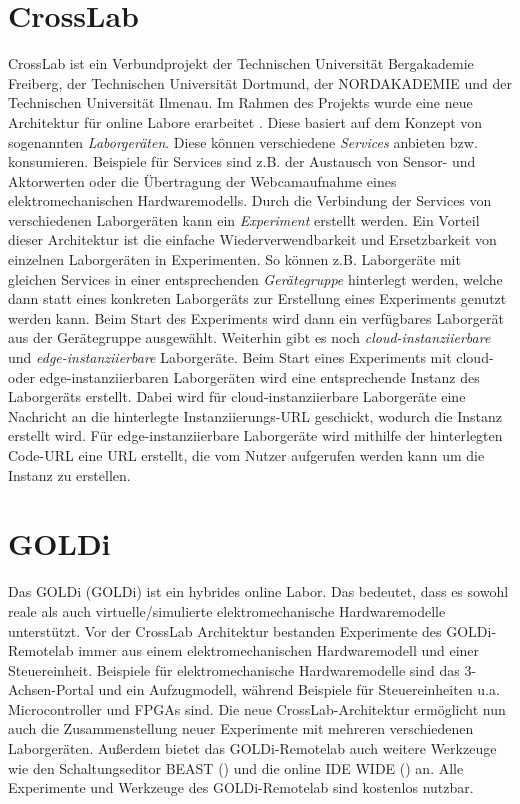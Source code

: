 \section{CrossLab}\label{section:grundlagen:crosslab}
CrossLab \cite{aubel_adaptable_2022} ist ein Verbundprojekt der Technischen Universität Bergakademie Freiberg, der Technischen Universität Dortmund, der NORDAKADEMIE und der Technischen Universität Ilmenau. Im Rahmen des Projekts wurde eine neue Architektur für online Labore erarbeitet \cite{nau_new_2022}. Diese basiert auf dem Konzept von sogenannten \textit{Laborgeräten}. Diese können verschiedene \textit{Services} anbieten bzw. konsumieren. Beispiele für Services sind z.B. der Austausch von Sensor- und Aktorwerten oder die Übertragung der Webcamaufnahme eines elektromechanischen Hardwaremodells. Durch die Verbindung der Services von verschiedenen Laborgeräten kann ein \textit{Experiment} erstellt werden. Ein Vorteil dieser Architektur ist die einfache Wiederverwendbarkeit und Ersetzbarkeit von einzelnen Laborgeräten in Experimenten. So können z.B. Laborgeräte mit gleichen Services in einer entsprechenden \textit{Gerätegruppe} hinterlegt werden, welche dann statt eines konkreten Laborgeräts zur Erstellung eines Experiments genutzt werden kann. Beim Start des Experiments wird dann ein verfügbares Laborgerät aus der Gerätegruppe ausgewählt. Weiterhin gibt es noch \textit{cloud-instanziierbare} und \textit{edge-instanziierbare} Laborgeräte. Beim Start eines Experiments mit cloud- oder edge-instanziierbaren Laborgeräten wird eine entsprechende Instanz des Laborgeräts erstellt. Dabei wird für cloud-instanziierbare Laborgeräte eine Nachricht an die hinterlegte Instanziierungs-URL geschickt, wodurch die Instanz erstellt wird. Für edge-instanziierbare Laborgeräte wird mithilfe der hinterlegten Code-URL eine URL erstellt, die vom Nutzer aufgerufen werden kann um die Instanz zu erstellen.

\section{GOLDi}\label{section:grundlagen:goldi}
Das \acl{GOLDi} (\acs{GOLDi}) \cite{sitepoint_goldi_nodate} ist ein hybrides online Labor. Das bedeutet, dass es sowohl reale als auch virtuelle/simulierte elektromechanische Hardwaremodelle unterstützt. Vor der CrossLab Architektur bestanden Experimente des GOLDi-Remotelab immer aus einem elektromechanischen Hardwaremodell und einer Steuereinheit. Beispiele für elektromechanische Hardwaremodelle sind das 3-Achsen-Portal und ein Aufzugmodell, während Beispiele für Steuereinheiten u.a. Microcontroller und \acp{FPGA} sind. Die neue CrossLab-Architektur ermöglicht nun auch die Zusammenstellung neuer Experimente mit mehreren verschiedenen Laborgeräten. Außerdem bietet das GOLDi-Remotelab auch weitere Werkzeuge wie den Schaltungseditor \acs{BEAST} () und die online IDE \acs{WIDE} () an. Alle Experimente und Werkzeuge des GOLDi-Remotelab sind kostenlos nutzbar.

